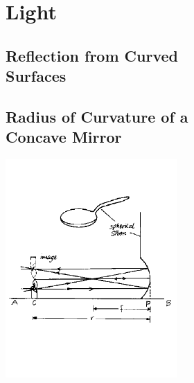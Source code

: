 \section{Light}

\begin{multicols}{2}


\section*{Reflection from Curved \hfill \\ Surfaces}


\subsection[Radius of Curvature of a Concave Mirror]{Radius of Curvature of a \hfill \\ Concave Mirror}

\begin{center}
\includegraphics[width=0.49\textwidth]{./img/source/radius-concave.png}
\end{center}


\end{multicols}
